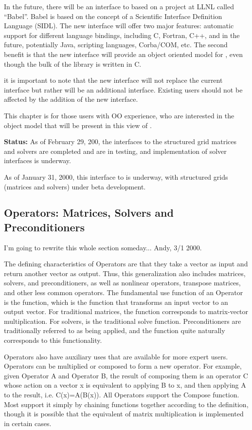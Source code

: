 In the future, there will be an interface to \hypre{} based on
a project at LLNL called ``Babel''. 
Babel is based on the concept of a Scientific Interface
Definition Language (SIDL).
The new interface will offer two major features:
automatic support for different language bindings, including
C, Fortran, C++, and in the future, potentially Java, scripting
languages, Corba/COM, etc.
The second benefit is that the new interface will provide an
object oriented model for \hypre{}, even though the bulk of
the library is written in C.

it is important to note that the new interface will not replace
the current interface but rather will be an additional interface.
Existing users should not be affected by the addition of the new
interface.

This chapter is for those users with OO experience, who are interested
in the object model that will be present in this view of \hypre{}.

{\bf Status:} As of February 29, 200, the interfaces to the structured
grid matrices and solvers are completed and are in testing, and implementation
of solver interfaces is underway. 

As of January 31, 2000, this interface to \hypre{}
is underway, with structured grids (matrices and solvers) under
beta development.


\subsection{Operators: Matrices, Solvers and Preconditioners}

I'm going to rewrite this whole section someday... Andy, 3/1 2000.

The defining characteristics of Operators are that they take a vector as input
and return another vector as 
output. Thus, this generalization also includes matrices, solvers, and preconditioners,
as well as nonlinear
operators, transpose matrices, 
and other less common operators. 
The fundamental use function of an Operator is the  function, which
is the function that transforms an input vector to an output vector. 
For traditional matrices, the  function corresponds to
matrix-vector multiplication. For 
solvers,  is the traditional solve function. 
Preconditioners are traditionally
referred to as being applied, 
and the  function quite naturally corresponds to this functionality. 

Operators also have auxiliary uses that are available for more
expert users.
Operators can be multiplied or composed to form a new operator.
For example, given Operator A and Operator B, the result of composing
them is an operator C whose action on a vector x is equivalent to
applying B to x, and then applying A to the result, i.e. C(x)=A(B(x)).
All Operators support the Compose function. 
Most support it simply by chaining  functions together according
to the definition, though it is possible that the equivalent of matrix 
multiplication is implemented in certain cases.

